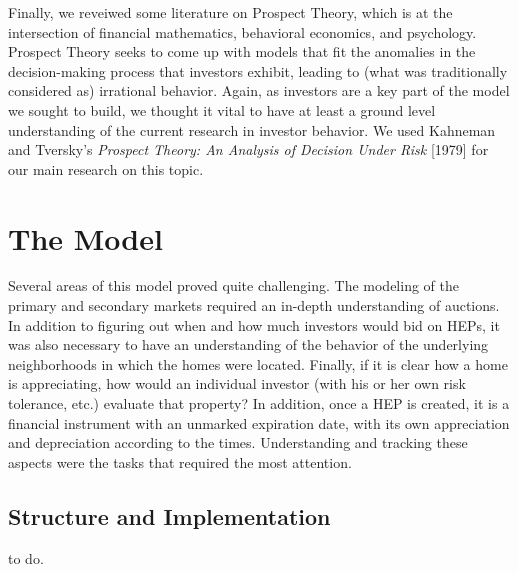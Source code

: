 \documentclass[twoside]{article}
\begin{document}
Finally, we reveiwed some literature on Prospect Theory, which is at the intersection of financial mathematics, behavioral economics, and psychology. Prospect Theory seeks to come up with models that fit the anomalies in the decision-making process that investors exhibit, leading to (what was traditionally considered as) irrational behavior. Again, as investors are a key part of the model we sought to build, we thought it vital to have at least a ground level understanding of the current research in investor behavior. We used Kahneman and Tversky's \textit{Prospect Theory: An Analysis of Decision Under Risk} [1979] for our main research on this topic.


\section{The Model}
Several areas of this model proved quite challenging. The modeling of the primary and secondary markets required an in-depth understanding of auctions. In addition to figuring out when and how much investors would bid on HEPs, it was also necessary to have an understanding of the behavior of the underlying neighborhoods in which the homes were located. Finally, if it is clear how a home is appreciating, how would an individual investor (with his or her own risk tolerance, etc.) evaluate that property? In addition, once a HEP is created, it is a financial instrument with an unmarked expiration date, with its own appreciation and depreciation according to the times. Understanding and tracking these aspects were the tasks that required the most attention.

\subsection{Structure and Implementation}
to do.
\end{document}
